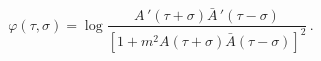 \begin{equation}\label{Liouville-solution}
\varphi(\tau,\sigma) =\log \frac{A\,'(\tau +\sigma)\bar A\,'(\tau -\sigma)}
{[1+m^2 A(\tau +\sigma)\bar A(\tau -\sigma)]^2}\,.
\end{equation} 

